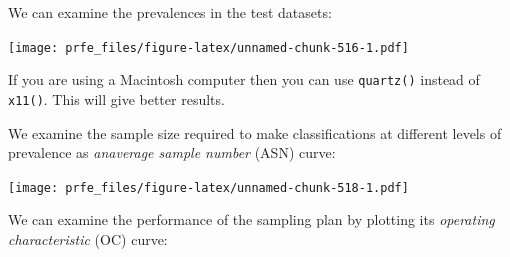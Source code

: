 \documentclass[12pt,a4paper]{book}
\newenvironment{Shaded}{\begin{snugshade}}{\end{snugshade}}
\newcommand{\KeywordTok}[1]{\textcolor[rgb]{0.13,0.29,0.53}{\textbf{#1}}}
\newcommand{\DataTypeTok}[1]{\textcolor[rgb]{0.13,0.29,0.53}{#1}}
\newcommand{\StringTok}[1]{\textcolor[rgb]{0.31,0.60,0.02}{#1}}
\newcommand{\OperatorTok}[1]{\textcolor[rgb]{0.81,0.36,0.00}{\textbf{#1}}}
\newcommand{\NormalTok}[1]{#1}
\theoremstyle{definition}
\theoremstyle{definition}
\theoremstyle{definition}
\theoremstyle{remark}
\begin{document}
We can examine the prevalences in the test datasets:

\begin{Shaded}
\end{Shaded}

\texttt{[image: prfe\_files/figure-latex/unnamed-chunk-516-1.pdf]}

If you are using a Macintosh computer then you can use \texttt{quartz()}
instead of \texttt{x11()}. This will give better results.

We examine the sample size required to make classifications at different
levels of prevalence as \emph{anaverage sample number} (ASN) curve:

\begin{Shaded}
\end{Shaded}

\texttt{[image: prfe\_files/figure-latex/unnamed-chunk-518-1.pdf]}

We can examine the performance of the sampling plan by plotting its
\emph{operating characteristic} (OC) curve:

\begin{Shaded}
\end{Shaded}
\end{document}
